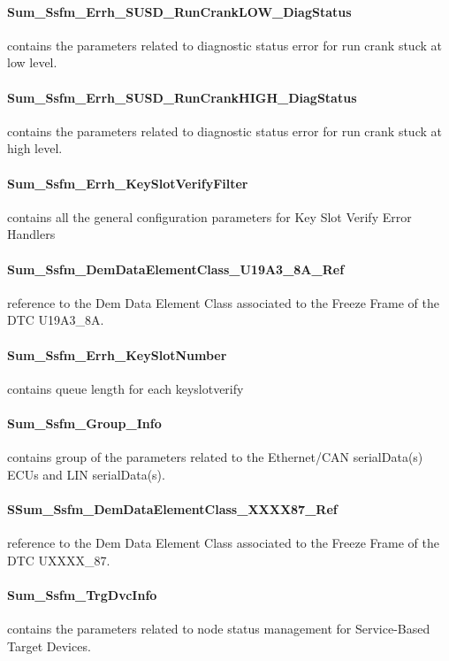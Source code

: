 \paragraph{Sum\_Ssfm\_Errh\_SUSD\_RunCrankLOW\_DiagStatus} contains the parameters related to diagnostic status error for run crank stuck at low level.

\paragraph{Sum\_Ssfm\_Errh\_SUSD\_RunCrankHIGH\_DiagStatus} contains the parameters related to diagnostic status error for run crank stuck at high level.

\paragraph{Sum\_Ssfm\_Errh\_KeySlotVerifyFilter} contains all the general configuration parameters for Key Slot Verify Error Handlers

\paragraph{Sum\_Ssfm\_DemDataElementClass\_U19A3\_8A\_Ref} reference to the Dem Data Element Class associated to the Freeze Frame of the DTC U19A3\_8A.

\paragraph{Sum\_Ssfm\_Errh\_KeySlotNumber} contains queue length for each keyslotverify

\paragraph{Sum\_Ssfm\_Group\_Info} contains group of the parameters related to the Ethernet/CAN serialData(s) ECUs and LIN serialData(s).

\paragraph{SSum\_Ssfm\_DemDataElementClass\_XXXX87\_Ref} reference to the Dem Data Element Class associated to the Freeze Frame of the DTC UXXXX\_87.

\paragraph{Sum\_Ssfm\_TrgDvcInfo} contains the parameters related to node status management for Service-Based Target Devices.

